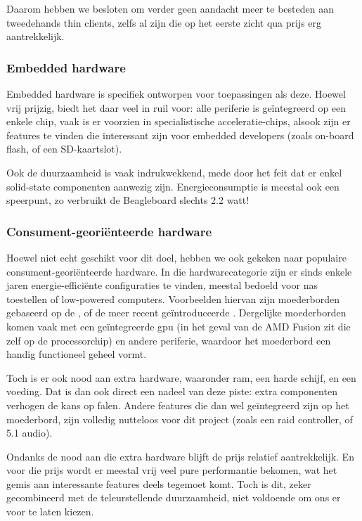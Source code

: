 Daarom hebben we besloten om verder geen aandacht meer te besteden aan tweedehands thin clients, zelfs al zijn die op het eerste zicht qua prijs erg aantrekkelijk.

\subsubsection{Embedded hardware}

Embedded hardware is specifiek ontworpen voor toepassingen als deze. Hoewel vrij prijzig, biedt het daar veel in ruil voor: alle periferie is geïntegreerd op een enkele chip, vaak is er voorzien in specialistische acceleratie-chips, alsook zijn er features te vinden die interessant zijn voor embedded developers (zoals on-board flash, of een SD-kaartslot).

Ook de duurzaamheid is vaak indrukwekkend, mede door het feit dat er enkel solid-state componenten aanwezig zijn. Energieconsumptie is meestal ook een speerpunt, zo verbruikt de Beagleboard slechts 2.2 watt!

\subsubsection{Consument-georiënteerde hardware}

Hoewel niet echt geschikt voor dit doel, hebben we ook gekeken naar populaire consument-georiënteerde hardware. In die hardwarecategorie zijn er sinds enkele jaren energie-efficiënte configuraties te vinden, meestal bedoeld voor \ac{nas} toestellen of low-powered computers. Voorbeelden hiervan zijn moederborden gebaseerd op de , of de meer recent geïntroduceerde . Dergelijke moederborden komen vaak met een geïntegreerde \ac{gpu} (in het geval van de AMD Fusion zit die zelf op de processorchip) en andere periferie, waardoor het moederbord een handig functioneel geheel vormt.

Toch is er ook nood aan extra hardware, waaronder \ac{ram}, een harde schijf, en een voeding. Dat is dan ook direct een nadeel van deze piste: extra componenten verhogen de kans op falen. Andere features die dan wel geïntegreerd zijn op het moederbord, zijn volledig nutteloos voor dit project (zoals een \ac{raid} controller, of 5.1 audio).

Ondanks de nood aan die extra hardware blijft de prijs relatief aantrekkelijk. En voor die prijs wordt er meestal vrij veel pure performantie bekomen, wat het gemis aan interessante features deels tegemoet komt. Toch is dit, zeker gecombineerd met de teleurstellende duurzaamheid, niet voldoende om ons er voor te laten kiezen.

